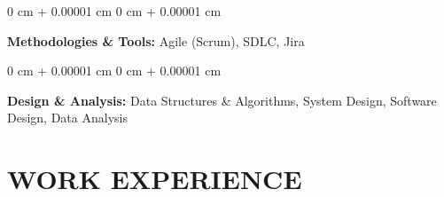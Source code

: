 \documentclass[10pt, letterpaper]{article}
\newenvironment{onecolentry}{
    \begin{adjustwidth}{
        0 cm + 0.00001 cm
    }{
        0 cm + 0.00001 cm
    }
}{
    \end{adjustwidth}
} %
\begin{document}
        \vspace{0.1 cm}
        \begin{onecolentry}
        \textbf{Methodologies \& Tools:}  Agile (Scrum), SDLC, Jira
        \end{onecolentry}
        \vspace{0.1 cm}
        \begin{onecolentry}
        \textbf{Design \& Analysis:} Data Structures \& Algorithms, System Design, Software Design, Data Analysis
        \end{onecolentry}

        
    \vspace{0.1 cm}    
    \section{WORK EXPERIENCE}
    \vspace{0.1 cm}
        
\end{document}
